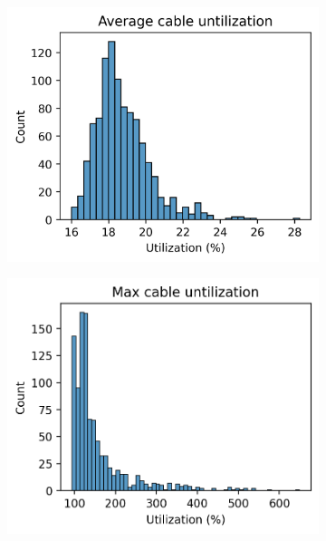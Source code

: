 \begin{figure}[H]
  \begin{subfigure}{.33\textwidth}
    \centering
    \includegraphics[width=\linewidth]{img/switchstate_exploring/suburb2/histograms/avg_cable_util.png}
    \caption{}
    \label{fig:appendix:suburb2:histograms:avg_cable}
  \end{subfigure}%
  \begin{subfigure}{.33\textwidth}
    \centering
    \includegraphics[width=\linewidth]{img/switchstate_exploring/suburb2/histograms/max_cable_util.png}
    \caption{}

\end{subfigure}
\end{figure}
